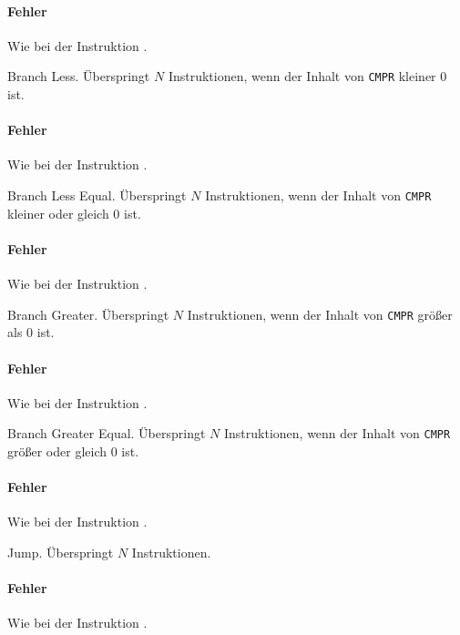 \paragraph{Fehler}
Wie bei der Instruktion .



\glqq Branch Less\grqq. Überspringt $N$ Instruktionen, wenn der Inhalt von
\texttt{CMPR} kleiner $0$ ist.

\paragraph{Fehler}
Wie bei der Instruktion .



\glqq Branch Less Equal\grqq.
Überspringt $N$ Instruktionen, wenn der Inhalt von \texttt{CMPR} kleiner oder
gleich $0$ ist.

\paragraph{Fehler}
Wie bei der Instruktion .


\glqq Branch Greater\grqq.
Überspringt $N$ Instruktionen, wenn der Inhalt von \texttt{CMPR} größer als
$0$ ist.

\paragraph{Fehler}
Wie bei der Instruktion .



\glqq Branch Greater Equal\grqq. 
Überspringt $N$ Instruktionen, wenn der Inhalt von \texttt{CMPR} größer oder
gleich $0$ ist.

\paragraph{Fehler}
Wie bei der Instruktion .



\glqq Jump\grqq.
Überspringt $N$ Instruktionen.

\paragraph{Fehler}
Wie bei der Instruktion .


